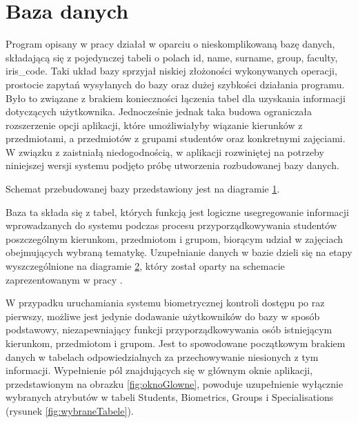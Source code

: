\section{Baza danych}
\label{sec:bazadanych}

Program opisany w pracy \cite{Gl11} działał w oparciu o nieskomplikowaną bazę danych, składającą się z pojedynczej tabeli o polach id, name, surname, group, faculty, iris\_code. Taki układ bazy sprzyjał niskiej złożoności wykonywanych operacji, prostocie zapytań wysyłanych do bazy oraz dużej szybkości działania programu. Było to związane z brakiem konieczności łączenia tabel dla uzyskania informacji dotyczących użytkownika. Jednocześnie jednak taka budowa ograniczała rozszerzenie opcji aplikacji, które umożliwiałyby wiązanie kierunków z przedmiotami, a przedmiotów z grupami studentów oraz konkretnymi zajęciami. W związku z zaistniałą niedogodnością, w aplikacji rozwiniętej na potrzeby niniejszej wersji systemu podjęto próbę utworzenia rozbudowanej bazy danych.

Schemat przebudowanej bazy przedstawiony jest na diagramie \ref{fig:bazaDanych}.

 
\begin{figure}
\label{fig:bazaDanych}
\end{figure}

Baza ta składa się z tabel, których funkcją jest logiczne usegregowanie informacji wprowadzanych do systemu podczas procesu przyporządkowywania studentów poszczególnym kierunkom, przedmiotom i grupom, biorącym udział w zajęciach obejmujących wybraną tematykę. Uzupełnianie danych w bazie dzieli się na etapy wyszczególnione na diagramie \ref{fig:etapyDzialania}, który został oparty na schemacie zaprezentowanym w pracy \cite{Gl11}.

\begin{figure}
\label{fig:etapyDzialania}
\end{figure}

W przypadku uruchamiania systemu biometrycznej kontroli dostępu po raz pierwszy, możliwe jest jedynie dodawanie użytkowników do bazy w sposób podstawowy, niezapewniający funkcji przyporządkowywania osób istniejącym kierunkom, przedmiotom i grupom. Jest to spowodowane początkowym brakiem danych w tabelach odpowiedzialnych za przechowywanie niesionych z tym informacji. Wypełnienie pól znajdujących się w głównym oknie aplikacji, przedstawionym na obrazku \ref{fig:oknoGlowne}, powoduje uzupełnienie wyłącznie wybranych atrybutów w tabeli Students, Biometrics, Groups i Specialisations (rysunek \ref{fig:wybraneTabele}). 

